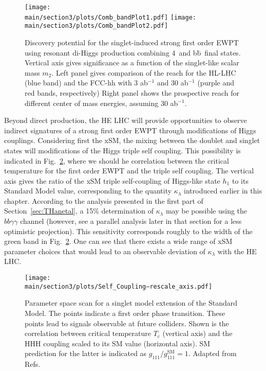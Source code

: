 \begin{figure}[hbtp]
  \begin{center}
    \texttt{[image: \\main/section3/plots/Comb\_bandPlot1.pdf]}
    \texttt{[image: \\main/section3/plots/Comb\_bandPlot2.pdf]}
    \caption{
    Discovery potential for the singlet-induced strong first order EWPT using resonant di-Higgs production combining 4\texttau\ and b\={b}\textgamma\textgamma\ final states\cite{Kotwal:2016tex}. Vertical axis gives significance as a function of the singlet-like scalar mass $m_2$. Left panel gives comparison of the reach for the HL-LHC (blue band) and the FCC-hh with 3 ab$^{-1}$ and 30 ab$^{-1}$ (purple and red bands, respectively) Right panel shows the prospective reach for different center of mass energies, assuming 30 ab$^{-1}$.    
        }
    \label{fig:ewpt_resdihiggs}
  \end{center}
\end{figure}

Beyond direct production, the HE LHC will provide opportunities to observe indirect signatures of a strong first order EWPT through modifications of Higgs couplings. Considering first the xSM, the mixing between the doublet and singlet states will modifications of the Higgs triple self coupling. This possibility is indicated in Fig.~\ref{fig:ewpt_self}, where we should he correlation between the critical temperature for the first order EWPT and the triple self coupling. The vertical axis gives the ratio of the xSM triple self-coupling of Higgs-like state $h_1$ to its Standard Model value, corresponding to the quantity $\kappa_\lambda$  introduced earlier in this chapter.  According to the analysis presented in the first part of Section~\ref{sec:THanetal}, a 15\% determination of $\kappa_\lambda$ may be possible using the $bb\gamma\gamma$ channel (however, see a parallel analysis later in that section for a less optimistic projection). This sensitivity corresponds roughly to the width of the green band in Fig.~\ref{fig:ewpt_self}. One can see that there exists a wide range of xSM parameter choices that would lead to an observable deviation of $\kappa_\lambda$ with the HE LHC.

\begin{figure}[hbtp]
  \begin{center}
    \texttt{[image: \\main/section3/plots/Self\_Coupling--rescale\_axis.pdf]}
    \caption{
    Parameter space scan for a singlet model extension of the Standard Model. The points indicate a first order phase transition. These points lead to signals observable at future colliders. Shown is the correlation between critical temperature $T_c$ (vertical axis) and the HHH coupling scaled to its SM value (horizontal axis). SM prediction for the latter is indicated as $g_{111}/g_{111}^\mathrm{SM}=1$. Adapted from Refs.~\cite{Profumo:2014opa}   
        }
    \label{fig:ewpt_self}
  \end{center}
\end{figure}

